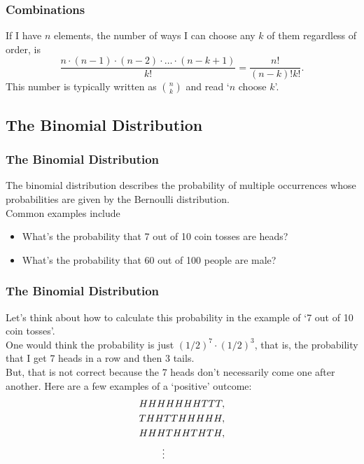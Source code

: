 \documentclass[aspectratio=169,11pt,usenames,dvipsnames,handout]{beamer}
\begin{document}
\begin{frame}
 \frametitle{Combinations}
 \begin{tcolorbox}[title=Combinations]
  If I have $n$ elements, the number of ways I can choose any $k$ of them
  regardless of order, is
  \[
   \frac{n \cdot (n-1) \cdot (n-2) \cdot \ldots \cdot (n-k+1)}{k!} =
   \frac{n!}{(n-k)!k!}.
  \]
  This number is typically written as $\binom{n}{k}$ and read `\alert{$n$ choose
  $k$}'.
 \end{tcolorbox}
\end{frame}

\subsection{The Binomial Distribution}

\begin{frame}
 \subsectionpage
\end{frame}

\begin{frame}
 \frametitle{The Binomial Distribution}
 The \alert{binomial distribution} describes the probability of multiple
 occurrences whose probabilities are given by the Bernoulli distribution.\\
 \pause
 Common examples include
 \begin{itemize}
  \item What's the probability that 7 out of 10 coin tosses are heads?
  \item What's the probability that 60 out of 100 people are male?
 \end{itemize}
\end{frame}

\begin{frame}
 \frametitle{The Binomial Distribution}
 Let's think about how to calculate this probability in the example of `7 out of
 10 coin tosses'.\\ \pause
 One would think the probability is just $(1 / 2)^{7} \cdot (1 / 2)^{3}$, that
 is, the probability that I get 7 heads in a row and then 3 tails.\\ \pause
 But, that is \alert{not correct} because the 7 heads don't necessarily come one
 after another. \pause Here are a few examples of a `positive' outcome:
 \begin{align*}
  & HHHHHHHTTT,\\
  & THHTTHHHHH,\\
  & HHHTHHTHTH,\\
  & \hspace{5.5ex} \vdots
 \end{align*}
\end{frame}
\end{document}
